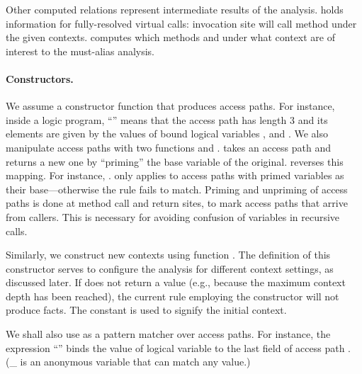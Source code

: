 
Other computed relations represent intermediate results of the analysis.
 holds information for fully-resolved virtual
calls: invocation site  will call method  under the
given contexts.   computes which methods and under what
context are of interest to the must-alias analysis.

\paragraph{Constructors.}
We assume a constructor function  that produces access paths. For
instance, inside a logic program, ``'' means that
the access path  has length 3 and its elements are given by the values
of bound logical variables ,  and .
We also manipulate access paths with two functions 
and .  takes an access path and
returns a new one by ``priming'' the base variable of the
original.  reverses this mapping. For instance,
. 
only applies to access paths with primed variables as their
base---otherwise the rule fails to match. Priming and unpriming of
access paths is done at method call and return sites, to mark access
paths that arrive from callers. This is necessary for avoiding
confusion of variables in recursive calls.

Similarly, we construct new contexts using function .  The
definition of this constructor serves to configure the analysis for different
context settings, as discussed later.  If  does not return
a value (e.g., because the maximum context depth has been reached), the current
rule employing the constructor will not produce facts.  The constant
 is used to signify the initial context.

We shall also use  as a pattern matcher over access paths. For
instance, the expression ``'' binds the value of logical
variable  to the last field of access path . (\_ is an
anonymous variable that can match any value.)


